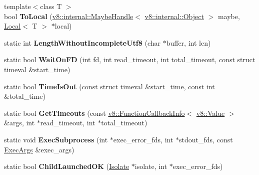 \begin{DoxyCompactItemize}
\item 
{\footnotesize template$<$class T $>$ }\\bool {\bfseries To\+Local} (\hyperlink{classv8_1_1internal_1_1_maybe_handle}{v8\+::internal\+::\+Maybe\+Handle}$<$ \hyperlink{classv8_1_1internal_1_1_object}{v8\+::internal\+::\+Object} $>$ maybe, \hyperlink{classv8_1_1_local}{Local}$<$ T $>$ $\ast$local)\hypertarget{namespacev8_aa09eba0b4d6bf92671bbbe002682ae33}{}\label{namespacev8_aa09eba0b4d6bf92671bbbe002682ae33}

\item 
static int {\bfseries Length\+Without\+Incomplete\+Utf8} (char $\ast$buffer, int len)\hypertarget{namespacev8_a8c74a0cfb63f18bb6fe0ebb06fafe3d7}{}\label{namespacev8_a8c74a0cfb63f18bb6fe0ebb06fafe3d7}

\item 
static bool {\bfseries Wait\+On\+FD} (int fd, int read\+\_\+timeout, int total\+\_\+timeout, const struct timeval \&start\+\_\+time)\hypertarget{namespacev8_a98b15a10a7c2370dfd9d1f6f13ccefec}{}\label{namespacev8_a98b15a10a7c2370dfd9d1f6f13ccefec}

\item 
static bool {\bfseries Time\+Is\+Out} (const struct timeval \&start\+\_\+time, const int \&total\+\_\+time)\hypertarget{namespacev8_a763f29764b1cbe97abe424d3773cefe1}{}\label{namespacev8_a763f29764b1cbe97abe424d3773cefe1}

\item 
static bool {\bfseries Get\+Timeouts} (const \hyperlink{classv8_1_1_function_callback_info}{v8\+::\+Function\+Callback\+Info}$<$ \hyperlink{classv8_1_1_value}{v8\+::\+Value} $>$ \&args, int $\ast$read\+\_\+timeout, int $\ast$total\+\_\+timeout)\hypertarget{namespacev8_a6a14615d0709d402475bb5cf350ec0ab}{}\label{namespacev8_a6a14615d0709d402475bb5cf350ec0ab}

\item 
static void {\bfseries Exec\+Subprocess} (int $\ast$exec\+\_\+error\+\_\+fds, int $\ast$stdout\+\_\+fds, const \hyperlink{classv8_1_1_exec_args}{Exec\+Args} \&exec\+\_\+args)\hypertarget{namespacev8_a81cf547f99338796be922e97d245e658}{}\label{namespacev8_a81cf547f99338796be922e97d245e658}

\item 
static bool {\bfseries Child\+Launched\+OK} (\hyperlink{classv8_1_1_isolate}{Isolate} $\ast$isolate, int $\ast$exec\+\_\+error\+\_\+fds)\hypertarget{namespacev8_ab4b0147c051552c3fa6bfd610b4b93ea}{}\label{namespacev8_ab4b0147c051552c3fa6bfd610b4b93ea}


\end{DoxyCompactItemize}
